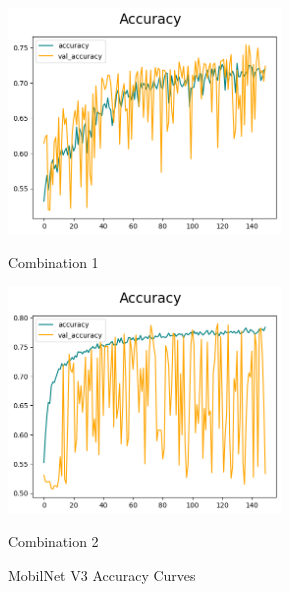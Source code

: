\begin{figure}[H]
    \centering
    \begin{minipage}[b]{0.49\textwidth}
        \centering
        \includegraphics[width=\textwidth, height=6cm]{Figures/balanced_data/less_data/withoutbn/mn3/accuracy.png}
        \captionsetup{labelformat=empty}
        \caption{Combination 1}
        \label{fig:u_wo_r_a}
    \end{minipage}
    \hfill
    \begin{minipage}[b]{0.49\textwidth}
        \centering
        \includegraphics[width=\textwidth, height=6cm]{Figures/balanced_data/less_data/withbn/mn3/accuracy.png}
        \captionsetup{labelformat=empty}
        \caption{Combination 2}
        \label{fig:u_w_r_a}
    \end{minipage}
    \captionsetup{labelformat=default}
    \caption{MobilNet V3 Accuracy Curves}
\end{figure}


